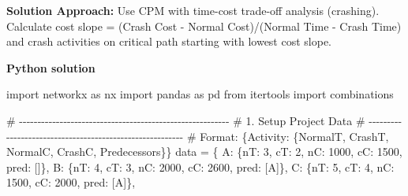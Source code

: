 \documentclass[
  letterpaper,
  DIV=11,
  numbers=noendperiod]{scrreprt}
\newenvironment{Shaded}{\begin{snugshade}}{\end{snugshade}}
\newcommand{\CommentTok}[1]{\textcolor[rgb]{0.37,0.37,0.37}{#1}}
\newcommand{\DecValTok}[1]{\textcolor[rgb]{0.68,0.00,0.00}{#1}}
\newcommand{\ImportTok}[1]{\textcolor[rgb]{0.00,0.46,0.62}{#1}}
\newcommand{\NormalTok}[1]{\textcolor[rgb]{0.00,0.23,0.31}{#1}}
\newcommand{\OperatorTok}[1]{\textcolor[rgb]{0.37,0.37,0.37}{#1}}
\newcommand{\StringTok}[1]{\textcolor[rgb]{0.13,0.47,0.30}{#1}}
\begin{document}
\textbf{Solution Approach:} Use CPM with time-cost trade-off analysis
(crashing). Calculate cost slope = (Crash Cost - Normal Cost)/(Normal
Time - Crash Time) and crash activities on critical path starting with
lowest cost slope.

\textbf{Python solution}

\begin{Shaded}
\begin{Highlighting}[]
\ImportTok{import}\NormalTok{ networkx }\ImportTok{as}\NormalTok{ nx}
\ImportTok{import}\NormalTok{ pandas }\ImportTok{as}\NormalTok{ pd}
\ImportTok{from}\NormalTok{ itertools }\ImportTok{import}\NormalTok{ combinations}

\CommentTok{\# {-}{-}{-}{-}{-}{-}{-}{-}{-}{-}{-}{-}{-}{-}{-}{-}{-}{-}{-}{-}{-}{-}{-}{-}{-}{-}{-}{-}{-}{-}{-}{-}{-}{-}{-}{-}{-}{-}{-}{-}{-}{-}{-}{-}{-}{-}{-}{-}{-}{-}{-}{-}{-}{-}{-}{-}{-}}
\CommentTok{\# 1. Setup Project Data}
\CommentTok{\# {-}{-}{-}{-}{-}{-}{-}{-}{-}{-}{-}{-}{-}{-}{-}{-}{-}{-}{-}{-}{-}{-}{-}{-}{-}{-}{-}{-}{-}{-}{-}{-}{-}{-}{-}{-}{-}{-}{-}{-}{-}{-}{-}{-}{-}{-}{-}{-}{-}{-}{-}{-}{-}{-}{-}{-}{-}}
\CommentTok{\# Format: \{Activity: \{NormalT, CrashT, NormalC, CrashC, Predecessors\}\}}
\NormalTok{data }\OperatorTok{=}\NormalTok{ \{}
    \StringTok{\textquotesingle{}A\textquotesingle{}}\NormalTok{: \{}\StringTok{\textquotesingle{}nT\textquotesingle{}}\NormalTok{: }\DecValTok{3}\NormalTok{, }\StringTok{\textquotesingle{}cT\textquotesingle{}}\NormalTok{: }\DecValTok{2}\NormalTok{, }\StringTok{\textquotesingle{}nC\textquotesingle{}}\NormalTok{: }\DecValTok{1000}\NormalTok{, }\StringTok{\textquotesingle{}cC\textquotesingle{}}\NormalTok{: }\DecValTok{1500}\NormalTok{, }\StringTok{\textquotesingle{}pred\textquotesingle{}}\NormalTok{: []\},}
    \StringTok{\textquotesingle{}B\textquotesingle{}}\NormalTok{: \{}\StringTok{\textquotesingle{}nT\textquotesingle{}}\NormalTok{: }\DecValTok{4}\NormalTok{, }\StringTok{\textquotesingle{}cT\textquotesingle{}}\NormalTok{: }\DecValTok{3}\NormalTok{, }\StringTok{\textquotesingle{}nC\textquotesingle{}}\NormalTok{: }\DecValTok{2000}\NormalTok{, }\StringTok{\textquotesingle{}cC\textquotesingle{}}\NormalTok{: }\DecValTok{2600}\NormalTok{, }\StringTok{\textquotesingle{}pred\textquotesingle{}}\NormalTok{: [}\StringTok{\textquotesingle{}A\textquotesingle{}}\NormalTok{]\},}
    \StringTok{\textquotesingle{}C\textquotesingle{}}\NormalTok{: \{}\StringTok{\textquotesingle{}nT\textquotesingle{}}\NormalTok{: }\DecValTok{5}\NormalTok{, }\StringTok{\textquotesingle{}cT\textquotesingle{}}\NormalTok{: }\DecValTok{4}\NormalTok{, }\StringTok{\textquotesingle{}nC\textquotesingle{}}\NormalTok{: }\DecValTok{1500}\NormalTok{, }\StringTok{\textquotesingle{}cC\textquotesingle{}}\NormalTok{: }\DecValTok{2000}\NormalTok{, }\StringTok{\textquotesingle{}pred\textquotesingle{}}\NormalTok{: [}\StringTok{\textquotesingle{}A\textquotesingle{}}\NormalTok{]\},}

\end{Highlighting}
\end{Shaded}
\end{document}
